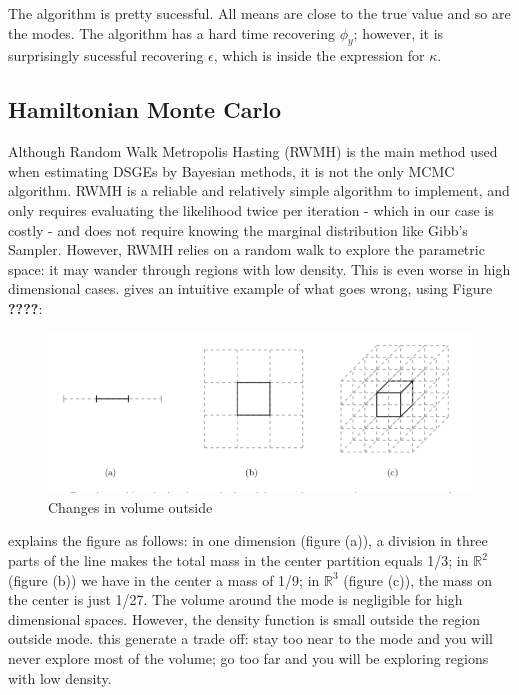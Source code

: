\documentclass[12pt,a4paper]{article}
\begin{document}
The algorithm is pretty sucessful. All means are close to the true value and so are the modes. The algorithm has a hard time recovering $\phi_y$; however, it is surprisingly sucessful recovering $\epsilon$, which is inside the expression for $\kappa$.  

\subsection{Hamiltonian Monte Carlo}
Although Random Walk Metropolis Hasting (RWMH) is the main method used when estimating DSGEs by Bayesian methods, it is not the only MCMC algorithm. RWMH is a reliable and relatively simple algorithm to implement, and only requires evaluating the likelihood twice per iteration - which in our case is costly - and does not require knowing the marginal distribution like Gibb's Sampler. However, RWMH relies on a random walk to explore the parametric space: it may wander through regions with low density. This is even worse in high dimensional cases.\cite{Betancourt2017} gives an intuitive example of what goes wrong, using Figure \textbf{????}:

\begin{figure}
\centering
\caption{Changes in volume outside }
\includegraphics[width=\linewidth]{../3regions.png}
\end{figure}


\cite{Betancourt2017} explains the figure as follows: in one dimension (figure (a)), a division in three parts of the line makes the total mass in the center partition equals 1/3; in $\mathbb{R}^2$ (figure (b)) we have in the center a mass of 1/9; in $\mathbb{R}^3$ (figure (c)), the mass on the center is just 1/27. The volume around the mode is negligible for high dimensional spaces. However, the density function is small outside the region outside mode. this generate a trade off: stay too near to the mode and you will never explore most of the volume; go too far and you will be exploring regions with low density.
\end{document}
